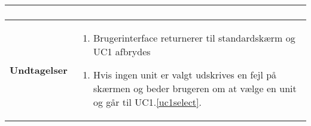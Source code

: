 \begin{table}[H]
\begin{tabular} {|p{6cm}|p{8cm}|}
\begin{enumerate}
			\end{enumerate}\\\hline
		
		\textbf{Undtagelser}					
		&\begin{enumerate}[label= \ref{uc1ex1}a.]
			\item Brugerinterface returnerer til standardskærm og UC1 afbrydes
		\end{enumerate}
											
		\begin{enumerate}[label= \ref{uc1ex2}a.]
			\item Hvis ingen unit er valgt udskrives en fejl på skærmen og beder brugeren om at vælge en unit og går til UC1.\ref{uc1select}.
		\end{enumerate} \\\hline
											

	\end{tabular}
	\label{UC1} 
\end{table}